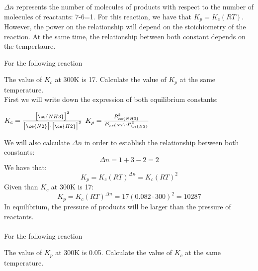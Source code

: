 \documentclass[main.tex]{subfiles}
\begin{document}
\begin{description}
$\Delta n$ represents the number of molecules of products with respect to the number of molecules of reactants: 7-6=1. For this reaction, we have that $K_p=K_c (RT)$. However, the power on the relationship will depend on the stoichiometry of the reaction. At the same time, the relationship between both constant depends on the tempertaure.
\begin{example} %
For the following reaction
\begin{center}\end{center}
The value of $K_c$ at 300K is 17. Calculate the value of $K_p$ at the same temperature.
\\
First we will write down the expression of both equilibrium constants:
\begin{center}$K_{c}=\frac{	\big[ \ce{NH3} \big]^2 			} {	\big[ \ce{N2} \big]\cdot \big[ \ce{H2} \big]^3	}$\hspace{1cm}
$K_{p}=\frac{	P_{\ce{NH3}}^2  		} {P_{\ce{N2}}	\cdot P_{\ce{H2}}^3		}$\end{center}
We will also calculate $\Delta n$ in order to establish the relationship between both constants:
\[\Delta n=1+3-2=2\]
We have that:
\[K_p=K_c (RT)^{\Delta n}=K_c (RT)^2\]
Given than $K_c$ at 300K is 17:
\[K_p=K_c (RT)^{\Delta n}=17 (0.082\cdot 300)^2=10287\]
In equilibrium, the pressure of products will be larger than the pressure of reactants.\\
\faDiamond\ \\
For the following reaction
\begin{center}\end{center}
The value of $K_p$ at 300K is 0.05. Calculate the value of $K_c$ at the same temperature.\\
\flushright  {\small Answer: $	2]times 10^{-3}$ }
\end{example}%






\end{description}
\end{document}
